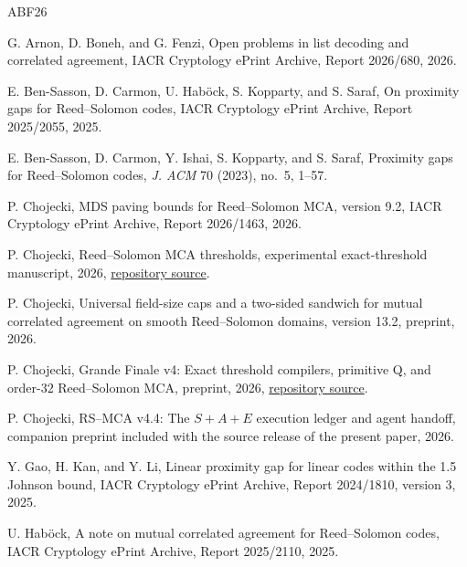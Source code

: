 \documentclass[11pt,a4paper]{amsart}
\numberwithin{equation}{section}
\theoremstyle{remark}
\begin{document}
\begin{thebibliography}{ABF26}

G. Arnon, D. Boneh, and G. Fenzi,
\newblock Open problems in list decoding and correlated agreement,
\newblock IACR Cryptology ePrint Archive, Report 2026/680, 2026.

E. Ben-Sasson, D. Carmon, U. Hab\"ock, S. Kopparty, and S. Saraf,
\newblock On proximity gaps for Reed--Solomon codes,
\newblock IACR Cryptology ePrint Archive, Report 2025/2055, 2025.

E. Ben-Sasson, D. Carmon, Y. Ishai, S. Kopparty, and S. Saraf,
\newblock Proximity gaps for Reed--Solomon codes,
\newblock \emph{J. ACM} 70 (2023), no.~5, 1--57.

P. Chojecki,
\newblock MDS paving bounds for Reed--Solomon MCA,
\newblock version 9.2, IACR Cryptology ePrint Archive, Report 2026/1463, 2026.

P. Chojecki,
\newblock Reed--Solomon MCA thresholds,
\newblock experimental exact-threshold manuscript, 2026,
\newblock \href{https://github.com/przchojecki/rs-mca/blob/5ecb9ab538a0a57dcb81018b17f32849049fb998/experimental/rs_mca_thresholds.tex}{repository source}.

P. Chojecki,
\newblock Universal field-size caps and a two-sided sandwich for mutual correlated agreement on smooth Reed--Solomon domains,
\newblock version 13.2, preprint, 2026.

P. Chojecki,
\newblock Grande Finale v4: Exact threshold compilers, primitive Q, and order-$32$ Reed--Solomon MCA,
\newblock preprint, 2026,
\newblock \href{https://github.com/przchojecki/rs-mca/blob/5ecb9ab538a0a57dcb81018b17f32849049fb998/experimental/grande_finale.tex}{repository source}.

P. Chojecki,
\newblock RS--MCA v4.4: The $S{+}A{+}E$ execution ledger and agent handoff,
\newblock companion preprint included with the source release of the present paper, 2026.


Y. Gao, H. Kan, and Y. Li,
\newblock Linear proximity gap for linear codes within the 1.5 Johnson bound,
\newblock IACR Cryptology ePrint Archive, Report 2024/1810, version 3, 2025.

U. Hab\"ock,
\newblock A note on mutual correlated agreement for Reed--Solomon codes,
\newblock IACR Cryptology ePrint Archive, Report 2025/2110, 2025.


\end{thebibliography}
\end{document}
